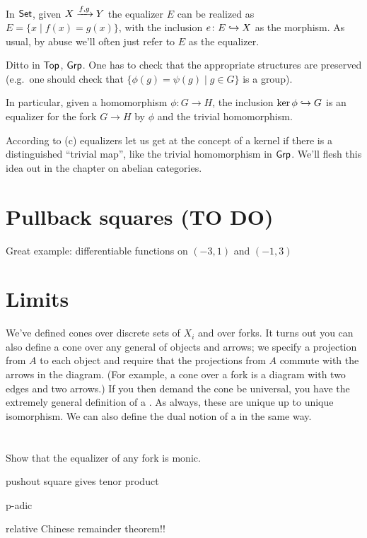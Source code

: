 \begin{example}
	\listhack
	\begin{enumerate}[(a)]
		\ii In $\mathsf{Set}$, given $X \xrightarrow{f,g} Y$
		the equalizer $E$ can be realized as $E = \{x \mid f(x) = g(x)\}$,
		with the inclusion $e \colon E \hookrightarrow X$ as the morphism.
		As usual, by abuse we'll often just refer to $E$ as the equalizer.

		\ii Ditto in $\mathsf{Top}$, $\mathsf{Grp}$.
		One has to check that the appropriate structures are preserved
		(e.g.\ one should check that $\{\phi(g) = \psi(g) \mid g \in G\}$ is a group).

		\ii In particular, given a homomorphism $\phi \colon G \to H$, the inclusion
		$ \ker\phi \hookrightarrow G $
		is an equalizer for the fork $G \to H$ by $\phi$ and the trivial homomorphism.
	\end{enumerate}
\end{example}

According to (c) equalizers let us get at the concept of a kernel
if there is a distinguished
``trivial map'', like the trivial homomorphism in $\mathsf{Grp}$.
We'll flesh this idea out in the chapter on abelian categories.

\section{Pullback squares (TO DO)}
Great example: differentiable functions on $(-3,1)$ and $(-1,3)$

\begin{example}
	\label{ex:diff_pullback}
\end{example}

\section{Limits}
We've defined cones over discrete sets of $X_i$ and over forks.
It turns out you can also define a cone over any general  of objects and arrows;
we specify a projection from $A$ to each object and
require that the projections from $A$ commute with the arrows in the diagram.
(For example, a cone over a fork is a diagram with two edges and two arrows.)
If you then demand the cone be universal,
you have the extremely general definition of a .
As always, these are unique up to unique isomorphism.
We can also define the dual notion of a  in the same way.


\section{\problemhead}
\begin{sproblem}
	Show that the equalizer of any fork is monic.
	\label{prob:equalizer_monic}
\end{sproblem}

pushout square gives tenor product

p-adic


relative Chinese remainder theorem!!
